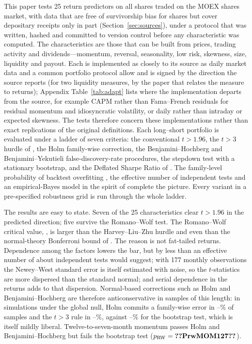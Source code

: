 \documentclass[11pt]{article}
\newcommand{\RW}{Romano--Wolf}
\begin{document}
This paper tests 25 return predictors on all shares traded on the MOEX shares market, with data that are free of
survivorship bias for shares but cover depositary receipts only in part (Section~\ref{sec:sources}), under a protocol that was written, hashed and committed to version control before any
characteristic was computed. The characteristics are those that can be built from prices, trading activity and
dividends---momentum, reversal, seasonality, low risk, skewness, size, liquidity and payout. Each is implemented
as closely to its source as daily market data and a common portfolio protocol allow and is signed by the direction
the source reports (for two liquidity measures, by the paper that relates the measure to returns); Appendix
Table~\ref{tab:adapt} lists where the implementation departs from the source, for
example CAPM rather than Fama--French residuals for residual momentum and idiosyncratic volatility, or daily rather
than intraday or expected skewness. The tests therefore concern these implementations rather than exact
replications of the original definitions. Each long--short portfolio is evaluated under a
ladder of seven criteria: the conventional $t>1.96$, the $t>3$ hurdle of \citet{harvey2016cross}, the Holm
family-wise correction, the Benjamini--Hochberg and Benjamini--Yekutieli false-discovery-rate procedures, the
\citet{romano2005stepwise} stepdown test with a stationary bootstrap, and the Deflated Sharpe Ratio of
\citet{bailey2014deflated}. The family-level probability of backtest overfitting \citep{bailey2017probability}, the
effective number of independent tests and an empirical-Bayes model in the spirit of \citet{jensen2023replication}
complete the picture. Every variant in a pre-specified robustness grid is run through the whole ladder.

The results are easy to state. Seven of the 25 characteristics clear $t>1.96$ in the predicted direction; five
survive the \RW{} test. The \RW{} critical value, , is larger than the Harvey--Liu--Zhu hurdle and even
than the normal-theory Bonferroni bound of . The reason is not fat-tailed returns. Dependence among
the factors lowers the bar, but by less than an effective number of about  independent tests would
suggest; with 177 monthly observations the Newey--West standard error is itself estimated with noise, so the
$t$-statistics are more dispersed than the standard normal; and serial dependence in the returns adds to that
dispersion. Normal-based corrections such as
Holm and Benjamini--Hochberg are therefore anticonservative in samples of this length: in simulations under the global
null, Holm commits a family-wise error in --\% of samples and the $t>3$ rule in
--\%, against --\% for the bootstrap test, which is itself
mildly liberal. Twelve-to-seven-month momentum passes Holm and Benjamini--Hochberg but fails the bootstrap test
($p_{\text{RW}}=\val{PrwMOM127}$).
\end{document}
